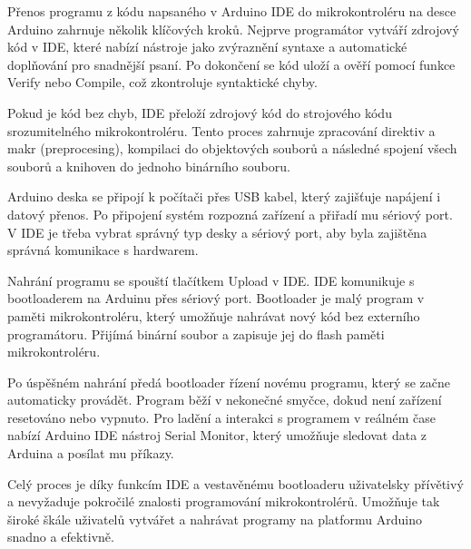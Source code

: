 Přenos programu z kódu napsaného v Arduino IDE do mikrokontroléru na desce Arduino zahrnuje několik klíčových kroků.
Nejprve programátor vytváří zdrojový kód v IDE, které nabízí nástroje jako zvýraznění syntaxe a automatické doplňování pro snadnější psaní.
Po dokončení se kód uloží a ověří pomocí funkce Verify nebo Compile, což zkontroluje syntaktické chyby.

Pokud je kód bez chyb, IDE přeloží zdrojový kód do strojového kódu srozumitelného mikrokontroléru.
Tento proces zahrnuje zpracování direktiv a makr (preprocesing), kompilaci do objektových souborů a následné spojení všech souborů a knihoven do jednoho binárního souboru.

Arduino deska se připojí k počítači přes USB kabel, který zajišťuje napájení i datový přenos.
Po připojení systém rozpozná zařízení a přiřadí mu sériový port.
V IDE je třeba vybrat správný typ desky a sériový port, aby byla zajištěna správná komunikace s hardwarem.

Nahrání programu se spouští tlačítkem Upload v IDE. IDE komunikuje s bootloaderem na Arduinu přes sériový port.
Bootloader je malý program v paměti mikrokontroléru, který umožňuje nahrávat nový kód bez externího programátoru.
Přijímá binární soubor a zapisuje jej do flash paměti mikrokontroléru.

Po úspěšném nahrání předá bootloader řízení novému programu, který se začne automaticky provádět.
Program běží v nekonečné smyčce, dokud není zařízení resetováno nebo vypnuto.
Pro ladění a interakci s programem v reálném čase nabízí Arduino IDE nástroj Serial Monitor, který umožňuje sledovat data z Arduina a posílat mu příkazy.

Celý proces je díky funkcím IDE a vestavěnému bootloaderu uživatelsky přívětivý a nevyžaduje pokročilé znalosti programování mikrokontrolérů.
Umožňuje tak široké škále uživatelů vytvářet a nahrávat programy na platformu Arduino snadno a efektivně.




